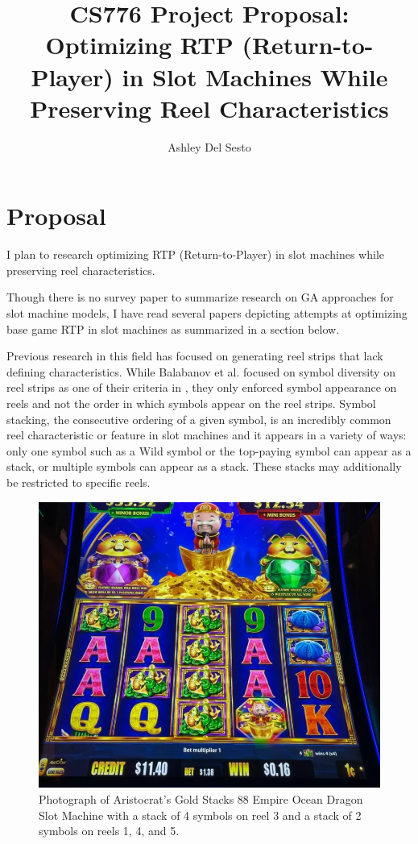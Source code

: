 \documentclass[11pt]{article} %
\title{CS776 Project Proposal: Optimizing RTP (Return-to-Player) in Slot Machines While Preserving Reel Characteristics}
\author{Ashley Del Sesto}
\begin{document}
\maketitle

\section{Proposal}
\par
I plan to research optimizing RTP (Return-to-Player) in slot machines while preserving reel characteristics.
\par
Though there is no survey paper to summarize research on GA approaches for slot machine models, I have read several papers depicting attempts at optimizing base game RTP in slot machines as summarized in a section below.
\par
Previous research in this field has focused on generating reel strips that lack defining characteristics.
While Balabanov et al. focused on symbol diversity on reel strips as one of their criteria in \cite{balabanovDDE}, they only enforced symbol appearance on reels and not the order in which symbols appear on the reel strips.
Symbol stacking, the consecutive ordering of a given symbol, is an incredibly common reel characteristic or feature in slot machines and it appears in a variety of ways: only one symbol such as a Wild symbol or the top-paying symbol can appear as a stack, or multiple symbols can appear as a stack.
These stacks may additionally be restricted to specific reels.
\begin{figure}[H]
\centering
\includegraphics[scale=0.25]{Stacks_Example}
\caption{Photograph of Aristocrat's Gold Stacks 88 Empire Ocean Dragon Slot Machine with a stack of 4 symbols on reel 3 and a stack of 2 symbols on reels 1, 4, and 5.}
\label{goldstacks88}
\end{figure}
\end{document}
